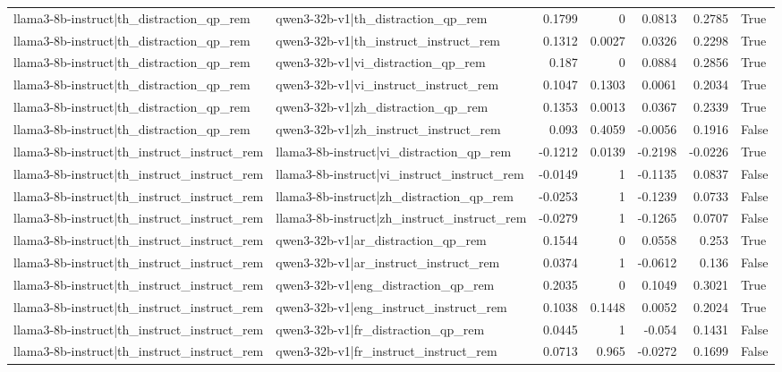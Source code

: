 \begin{table}
\begin{tabular}{l l r r r r l}
llama3-8b-instruct|th_distraction_qp_rem & qwen3-32b-v1|th_distraction_qp_rem & 0.1799 & 0 & 0.0813 & 0.2785 & True \\
llama3-8b-instruct|th_distraction_qp_rem & qwen3-32b-v1|th_instruct_instruct_rem & 0.1312 & 0.0027 & 0.0326 & 0.2298 & True \\
llama3-8b-instruct|th_distraction_qp_rem & qwen3-32b-v1|vi_distraction_qp_rem & 0.187 & 0 & 0.0884 & 0.2856 & True \\
llama3-8b-instruct|th_distraction_qp_rem & qwen3-32b-v1|vi_instruct_instruct_rem & 0.1047 & 0.1303 & 0.0061 & 0.2034 & True \\
llama3-8b-instruct|th_distraction_qp_rem & qwen3-32b-v1|zh_distraction_qp_rem & 0.1353 & 0.0013 & 0.0367 & 0.2339 & True \\
llama3-8b-instruct|th_distraction_qp_rem & qwen3-32b-v1|zh_instruct_instruct_rem & 0.093 & 0.4059 & -0.0056 & 0.1916 & False \\
llama3-8b-instruct|th_instruct_instruct_rem & llama3-8b-instruct|vi_distraction_qp_rem & -0.1212 & 0.0139 & -0.2198 & -0.0226 & True \\
llama3-8b-instruct|th_instruct_instruct_rem & llama3-8b-instruct|vi_instruct_instruct_rem & -0.0149 & 1 & -0.1135 & 0.0837 & False \\
llama3-8b-instruct|th_instruct_instruct_rem & llama3-8b-instruct|zh_distraction_qp_rem & -0.0253 & 1 & -0.1239 & 0.0733 & False \\
llama3-8b-instruct|th_instruct_instruct_rem & llama3-8b-instruct|zh_instruct_instruct_rem & -0.0279 & 1 & -0.1265 & 0.0707 & False \\
llama3-8b-instruct|th_instruct_instruct_rem & qwen3-32b-v1|ar_distraction_qp_rem & 0.1544 & 0 & 0.0558 & 0.253 & True \\
llama3-8b-instruct|th_instruct_instruct_rem & qwen3-32b-v1|ar_instruct_instruct_rem & 0.0374 & 1 & -0.0612 & 0.136 & False \\
llama3-8b-instruct|th_instruct_instruct_rem & qwen3-32b-v1|eng_distraction_qp_rem & 0.2035 & 0 & 0.1049 & 0.3021 & True \\
llama3-8b-instruct|th_instruct_instruct_rem & qwen3-32b-v1|eng_instruct_instruct_rem & 0.1038 & 0.1448 & 0.0052 & 0.2024 & True \\
llama3-8b-instruct|th_instruct_instruct_rem & qwen3-32b-v1|fr_distraction_qp_rem & 0.0445 & 1 & -0.054 & 0.1431 & False \\
llama3-8b-instruct|th_instruct_instruct_rem & qwen3-32b-v1|fr_instruct_instruct_rem & 0.0713 & 0.965 & -0.0272 & 0.1699 & False \\

\end{tabular}
\end{table}
